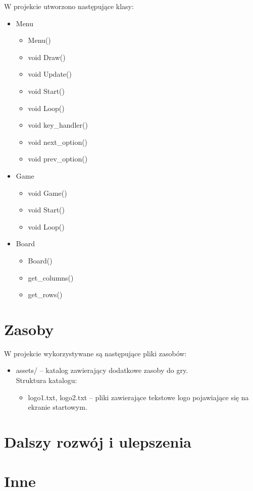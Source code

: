 \documentclass{article}
\begin{document}
W projekcie utworzono następujące klasy:
\begin{itemize}
    \item Menu
        \begin{itemize}
            \item Menu()
            \item void Draw()
            \item void Update()
            \item void Start()
            \item void Loop()
            \item void key\_handler()
            \item void next\_option()
            \item void prev\_option()
        \end{itemize}

    \item Game
        \begin{itemize}
            \item void Game()
            \item void Start()
            \item void Loop()
        \end{itemize}

    \item Board
        \begin{itemize}
            \item Board()
            \item get\_columns()
            \item get\_rows()
        \end{itemize}
\end{itemize}
     
\section{Zasoby}

W projekcie wykorzystywane są następujące pliki zasobów:
    \begin{itemize}
    \item assets/ – katalog zawierający dodatkowe zasoby do gry.\\
    Struktura katalogu:
        \begin{itemize}
            \item logo1.txt, logo2.txt – pliki zawierające tekstowe logo pojawiające się na ekranie startowym.
        \end{itemize}
    \end{itemize}

\section{Dalszy rozwój i ulepszenia}

\section{Inne}
\end{document}
